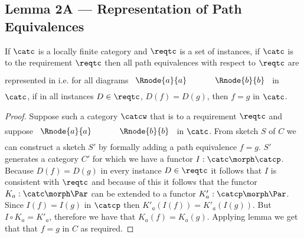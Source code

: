 
\subsection{Lemma 2A --- Representation of Path Equivalences}

\begin{lemma}
If $\catc$ is a locally finite category and $\reqtc$ is a set of instances, if $\catc$ is 
 to the requirement $\reqtc$ then all path equivalences with respect
to $\reqtc$ are represented in \catcw
i.e. for all diagrams
$
\rule[-0.3cm]{0pt}{0.9cm} %
\begin{array}{c p{0.5cm} c  }
 \Rnode{a}{a}            &&   \Rnode{b}{b}
\end{array} 
$
in $\catc$,  if in all instances $D \in \reqtc$, $D(f)=D(g)$, 
then $f=g$ in $\catc$.
\end{lemma}
\begin{proof}
Suppose such a category  $\catcw$  that  is 
 to a requirement $\reqtc$
and suppose 
$
\rule[-0.3cm]{0pt}{0.8cm} %
\begin{array}{c p{0.5cm} c  }
 \Rnode{a}{a}            &&   \Rnode{b}{b}
\end{array} 
$
in $\catc$. From sketch $S$ of $C$ we can construct a sketch $S'$ by formally adding a path equivalence $f=g$.
$S'$ generates a category $C'$ for which we have a functor $I: \catc \morph \catcp$. 
Because $D(f) = D(g)$ in every instance $D \in \reqtc$
it follows that $I$ is consistent with $\reqtc$ and because 
of this it follows that the functor $K_a: \catc \morph \Par$ 
can be extended to a functor $K'_a: \catcp \morph \Par$. 
Since $I(f)=I(g)$ in $\catcp$ then $K'_a(I(f))=K'_a(I(g))$. 
But $I \circ K_a = K'_a$, therefore we have that $K_a(f)=K_a(g)$. 
Applying lemma   we get that that $f=g$ in $C$ as required.
\end{proof}